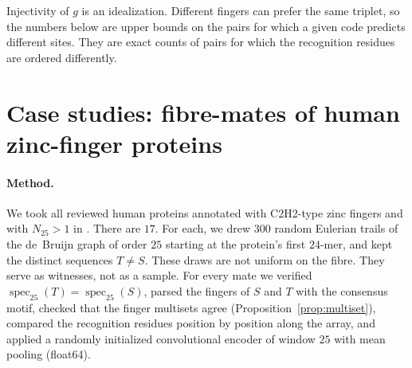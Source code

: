 \documentclass[11pt]{article}
\theoremstyle{plain}
\theoremstyle{definition}
\theoremstyle{remark}
\newcommand{\spec}{\operatorname{spec}}
\begin{document}
Injectivity of $g$ is an idealization. Different fingers can prefer the same triplet, so the numbers below are
upper bounds on the pairs for which a given code predicts different sites. They are exact counts of pairs
for which the recognition residues are ordered differently.

\section{Case studies: fibre-mates of human zinc-finger proteins}\label{sec:cases}

\paragraph{Method.} We took all reviewed human proteins annotated with C2H2-type zinc fingers and with
$N_{25}>1$ in \cite{CC26a}. There are $17$. For each, we drew $300$ random Eulerian trails of the de~Bruijn graph of
order $25$ starting at the protein's first $24$-mer, and kept the distinct sequences $T\ne S$. These draws are not
uniform on the fibre. They serve as witnesses, not as a sample. For every mate we verified
$\spec_{25}(T)=\spec_{25}(S)$, parsed the fingers of $S$ and $T$ with the consensus motif, checked that the finger
multisets agree (Proposition~\ref{prop:multiset}), compared the recognition residues position by position along the
array, and applied a randomly initialized convolutional encoder of window $25$ with mean pooling (float64).
\end{document}
